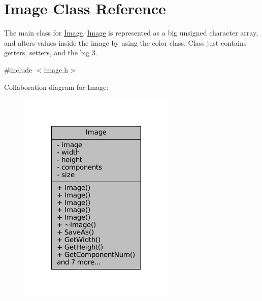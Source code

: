 \hypertarget{classImage}{}\section{Image Class Reference}
\label{classImage}


The main class for \hyperlink{classImage}{Image}. \hyperlink{classImage}{Image} is represented as a big unsigned character array, and alters values inside the image by using the color class. Class just contains getters, setters, and the big 3.  




{\ttfamily \#include $<$image.\+h$>$}



Collaboration diagram for Image\+:\nopagebreak
\begin{figure}[H]
\begin{center}
\leavevmode
\includegraphics[width=212pt]{classImage__coll__graph}
\end{center}
\end{figure}
